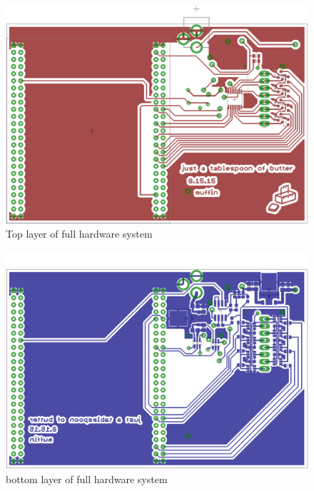 \documentclass[11pt,twoside]{mitthesis}
\begin{document}
\begin{figure}[h]
  \begin{center}
      \includegraphics[width=.9\textwidth]{../layout-t.png}
      \caption{Top layer of full hardware system}
  \end{center}
\end{figure}

\begin{figure}[h]
  \begin{center}
      \includegraphics[width=.9\textwidth]{../layout-b.png}
      \caption{bottom layer of full hardware system}
  \end{center}
\end{figure}
\end{document}
